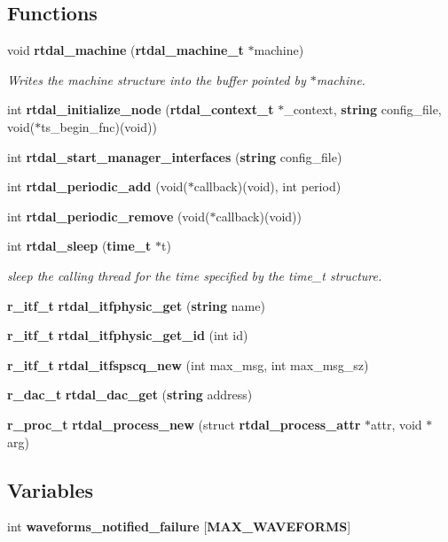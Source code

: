 \subsection*{Functions}
\begin{DoxyCompactItemize}
\item 
void {\bf rtdal\-\_\-machine} ({\bf rtdal\-\_\-machine\-\_\-t} $\ast$machine)
\begin{DoxyCompactList}\small\item\em Writes the machine structure into the buffer pointed by $\ast$machine. \end{DoxyCompactList}\item 
int {\bf rtdal\-\_\-initialize\-\_\-node} ({\bf rtdal\-\_\-context\-\_\-t} $\ast$\-\_\-context, {\bf string} config\-\_\-file, void($\ast$ts\-\_\-begin\-\_\-fnc)(void))
\item 
int {\bf rtdal\-\_\-start\-\_\-manager\-\_\-interfaces} ({\bf string} config\-\_\-file)
\item 
int {\bf rtdal\-\_\-periodic\-\_\-add} (void($\ast$callback)(void), int period)
\item 
int {\bf rtdal\-\_\-periodic\-\_\-remove} (void($\ast$callback)(void))
\item 
int {\bf rtdal\-\_\-sleep} ({\bf time\-\_\-t} $\ast$t)
\begin{DoxyCompactList}\small\item\em sleep the calling thread for the time specified by the time\-\_\-t structure. \end{DoxyCompactList}\item 
{\bf r\-\_\-itf\-\_\-t} {\bf rtdal\-\_\-itfphysic\-\_\-get} ({\bf string} name)
\item 
{\bf r\-\_\-itf\-\_\-t} {\bf rtdal\-\_\-itfphysic\-\_\-get\-\_\-id} (int id)
\item 
{\bf r\-\_\-itf\-\_\-t} {\bf rtdal\-\_\-itfspscq\-\_\-new} (int max\-\_\-msg, int max\-\_\-msg\-\_\-sz)
\item 
{\bf r\-\_\-dac\-\_\-t} {\bf rtdal\-\_\-dac\-\_\-get} ({\bf string} address)
\item 
{\bf r\-\_\-proc\-\_\-t} {\bf rtdal\-\_\-process\-\_\-new} (struct {\bf rtdal\-\_\-process\-\_\-attr} $\ast$attr, void $\ast$arg)
\end{DoxyCompactItemize}
\subsection*{Variables}
\begin{DoxyCompactItemize}
\item 
int {\bf waveforms\-\_\-notified\-\_\-failure} [{\bf M\-A\-X\-\_\-\-W\-A\-V\-E\-F\-O\-R\-M\-S}]
\end{DoxyCompactItemize}


